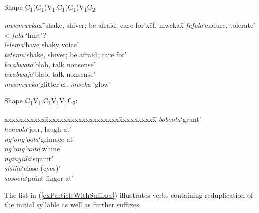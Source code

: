 \begin{exe}
\ex \begin{xlist} \label{exPartielleOhneSuffixe}
\ex Shape C\textsubscript{1}(G\textsubscript{1})V\textsubscript{1}.C\textsubscript{1}(G\textsubscript{1})V\textsubscript{1}C\textsubscript{2}:
\begin{tabbing}
\textit{mwemweka}x\=`shake, shiver; be afraid; care for'x\=cf. mwekax\=\kill%
\textit{fufula}\>`endure, tolerate'\> < \textit{fula} \lq hurt'?\\
\textit{lelema}\>`have shaky voice'\\
\textit{tetema}\>`shake, shiver; be afraid; care for'\\
\textit{bwabwata}\>`blab, talk nonsense'\\
\textit{bwabwaja}\>`blab, talk nonsense'\\
\textit{mwemweka}\>`glitter'\>cf. \textit{mweka} \lq glow'
\end{tabbing}

\clearpage

\ex Shape C\textsubscript{1}V\textsubscript{1}.C\textsubscript{1}V\textsubscript{1}V\textsubscript{1}C\textsubscript{2}:
\begin{tabbing}
xxxxxxxxxxx\=xxxxxxxxxxxxxxxxxxxx\=xxxxxxxxxx\=\kill
\textit{boboota}\>`grunt'\\
\textit{hohoola}\>`jeer, laugh at'\\
\textit{ng'ong'oola}\>`grimace at'\\
\textit{ng'ung'uuta}\>`whine'\\
\textit{nyinyiila}\>\lq squint'\\
\textit{sisiila}\>`close (eyes)'\\	%
\textit{sosoola}\>`point finger at'
\end{tabbing}
\end{xlist}
\end{exe}
The list in (\ref{exPartieleWithSuffixes}) illustrates verbs containing reduplication of the initial syllable as well as further suffixes.
